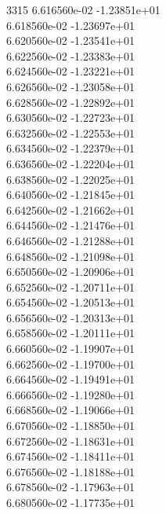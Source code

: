 3315	6.616560e-02	-1.23851e+01	\\ 	6.618560e-02	-1.23697e+01	\\ 	6.620560e-02	-1.23541e+01	\\ 	6.622560e-02	-1.23383e+01	\\ 	6.624560e-02	-1.23221e+01	\\ 	6.626560e-02	-1.23058e+01	\\ 	6.628560e-02	-1.22892e+01	\\ 	6.630560e-02	-1.22723e+01	\\ 	6.632560e-02	-1.22553e+01	\\ 	6.634560e-02	-1.22379e+01	\\ 	6.636560e-02	-1.22204e+01	\\ 	6.638560e-02	-1.22025e+01	\\ 	6.640560e-02	-1.21845e+01	\\ 	6.642560e-02	-1.21662e+01	\\ 	6.644560e-02	-1.21476e+01	\\ 	6.646560e-02	-1.21288e+01	\\ 	6.648560e-02	-1.21098e+01	\\ 	6.650560e-02	-1.20906e+01	\\ 	6.652560e-02	-1.20711e+01	\\ 	6.654560e-02	-1.20513e+01	\\ 	6.656560e-02	-1.20313e+01	\\ 	6.658560e-02	-1.20111e+01	\\ 	6.660560e-02	-1.19907e+01	\\ 	6.662560e-02	-1.19700e+01	\\ 	6.664560e-02	-1.19491e+01	\\ 	6.666560e-02	-1.19280e+01	\\ 	6.668560e-02	-1.19066e+01	\\ 	6.670560e-02	-1.18850e+01	\\ 	6.672560e-02	-1.18631e+01	\\ 	6.674560e-02	-1.18411e+01	\\ 	6.676560e-02	-1.18188e+01	\\ 	6.678560e-02	-1.17963e+01	\\ 	6.680560e-02	-1.17735e+01	\\ \hline
